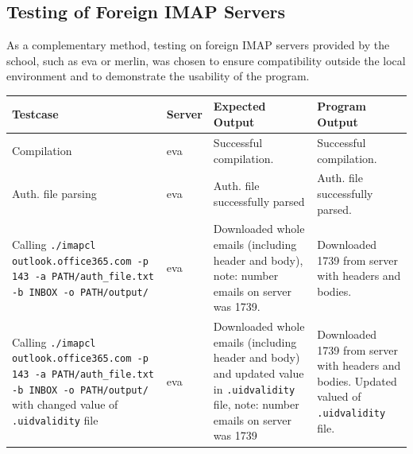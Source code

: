 \documentclass[a4paper,11pt]{article}
\begin{document}
\subsection{Testing of Foreign IMAP Servers}
As a complementary method, testing on foreign IMAP servers provided by the school, such as eva 
or merlin, was chosen to ensure compatibility outside the local environment and to demonstrate 
the usability of the program.

\begin{center}
    \vspace{0.5cm} %
    \begin{tabularx}{\textwidth}{|>{\raggedright\arraybackslash}p{5cm}|>{\raggedright\arraybackslash}p{1cm}|>{\raggedright\arraybackslash}p{5cm}|>{\raggedright\arraybackslash}X|}
        \hline
        \textbf{Testcase} & \textbf{Server} & \textbf{Expected Output} & \textbf{Program Output} \\
        \hline
        Compilation & eva & Successful compilation. & Successful compilation. \\
        \hline
        Auth. file parsing & eva & Auth. file successfully parsed & Auth. file successfully parsed. \\
        \hline
        Calling \texttt{./imapcl outlook.office365.com -p 143 -a PATH/auth\_file.txt -b INBOX -o PATH/output/} & eva & Downloaded whole emails (including header and body), note: number emails on server was 1739. & Downloaded 1739 from server with headers and bodies. \\
        \hline
        Calling \texttt{./imapcl outlook.office365.com -p 143 -a PATH/auth\_file.txt -b INBOX -o PATH/output/} with changed value of \texttt{.uidvalidity} file & eva & Downloaded whole emails (including header and body) and updated value in \texttt{.uidvalidity} file, note: number emails on server was 1739 & Downloaded 1739 from server with headers and bodies. Updated valued of \texttt{.uidvalidity} file. \\
        \hline
    \end{tabularx}
    \vspace{0.5cm} %
\end{center}
\end{document}
